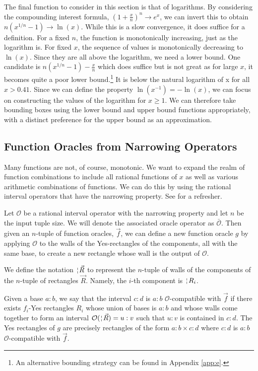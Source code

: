 \documentclass[12pt]{article}
\begin{document}
The final function to consider in this section is that of logarithms. By considering the compounding interest formula, $(1+ \frac{x}{n})^n \to e^x$, we can invert this to obtain $n (x^{1/n} - 1) \to \ln(x)$. While this is a slow convergence, it does suffice for a definition. For a fixed $n$, the function is monotonically increasing, just as the logarithm is. For fixed $x$, the sequence of values is monotonically decreasing to $\ln(x)$. Since they are all above the logarithm, we need a lower bound. One candidate is  $n (x^{1/n} - 1) - \frac{x}{n} $ which does suffice but is not great as for large $x$, it becomes quite a poor lower bound.\footnote{An alternative bounding strategy can be found in Appendix \ref{app:e}.} It is below the natural logarithm of x for all $x > 0.41$. Since we can define the property $\ln(x^{-1}) = - \ln(x)$, we can focus on constructing the values of the logarithm for $x\geq 1$. We can therefore take bounding boxes using the lower bound and upper bound functions appropriately, with a distinct preference for the upper bound as an approximation.  


\subsection{Function Oracles from Narrowing Operators}

Many functions are not, of course, monotonic. We want to expand the realm of function combinations to include all rational functions of $x$ as well as various arithmetic combinations of functions. We can do this by using the rational interval operators that have the narrowing property. See \cite{taylor23main} for a refresher.


Let $\mathcal{O}$ be a rational interval operator with the narrowing property and let $n$ be the input tuple size. We will denote the associated oracle operator as $\bar{\mathcal{O}}$. Then given an $n$-tuple of function oracles, $\vec{f}$, we can define a new function oracle $g$ by applying $\mathcal{O}$ to the walls of the Yes-rectangles of the components, all with the same base, to create a new rectangle whose wall is the output of $\mathcal{O}$. 

We define the notation $\wall{\vec{R}}$ to represent the $n$-tuple of walls of the components of the $n$-tuple of rectangles $\vec{R}$. Namely, the $i$-th component is $\wall{R_i}$.  

Given a base $a:b$, we say that the interval $c:d$ is $a:b$ $\mathcal{O}$-compatible with $\vec{f}$ if there exists $f_i$-Yes rectangles $R_i$ whose union of bases is $a:b$ and whose walls come together to form an interval $\mathcal{O}(\wall{\vec{R}}) = u:v$ such that $u:v$ is contained in $c:d$. The Yes rectangles of $g$ are precisely rectangles of the form $a:b \times c:d$ where $c:d$ is $a:b$ $\mathcal{O}$-compatible with $\vec{f}$. 
\end{document}
